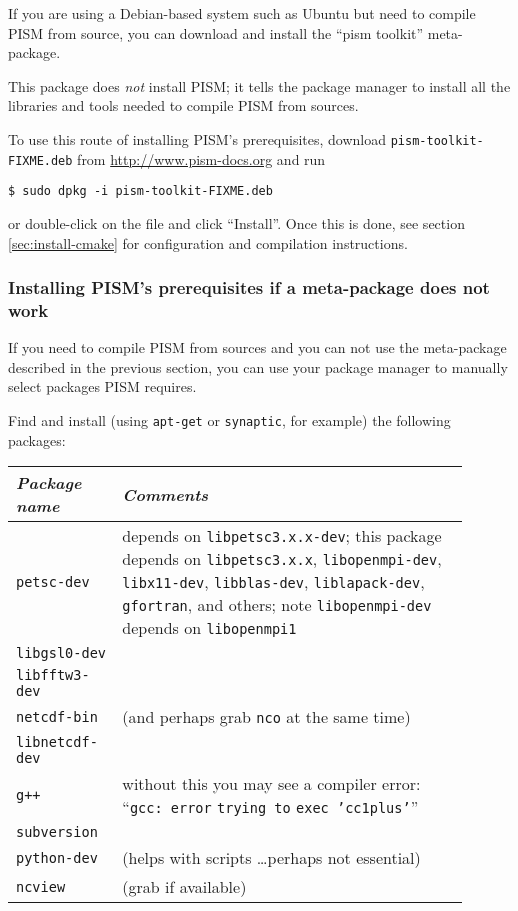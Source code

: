 \documentclass[11pt,final]{amsart}
\begin{document}
If you are using a Debian-based system such as Ubuntu but need to compile PISM from source, you can download and install the
``pism toolkit'' meta-package.

This package does \emph{not} install PISM; it tells the package manager to install all the libraries and tools needed to compile
PISM from sources.

To use this route of installing PISM's prerequisites, download \texttt{pism-toolkit-FIXME.deb} from \url{http://www.pism-docs.org} and run
\begin{verbatim}
$ sudo dpkg -i pism-toolkit-FIXME.deb
\end{verbatim}%
or double-click on the file and click ``Install''. Once this is done, see section \ref{sec:install-cmake} for configuration and
compilation instructions.

\subsubsection{Installing PISM's prerequisites if a meta-package does not work}
\label{sec:deb-libraries-by-hand}

If you need to compile PISM from sources and you can not use the meta-package described in the previous section, you can use your
package manager to manually select packages PISM requires.

Find and install (using \texttt{apt-get} or \texttt{synaptic}, for example) the following packages:
  \begin{center}
    \begin{tabular*}{0.9\linewidth}{p{0.2\linewidth}p{0.7\linewidth}}
      \toprule
      \emph{Package name} & \emph{Comments}\\
      \midrule
      \texttt{petsc-dev} & depends on \texttt{libpetsc3.x.x-dev}; this package 
      depends on \texttt{libpetsc3.x.x}, \texttt{libopenmpi-dev}, \texttt{libx11-dev},
      \texttt{libblas-dev}, \texttt{liblapack-dev}, \texttt{gfortran}, and others; 
      note \texttt{libopenmpi-dev} depends on \texttt{libopenmpi1}\\
      \texttt{libgsl0-dev} & \\
      \texttt{libfftw3-dev} & \\
      \texttt{netcdf-bin} & (and perhaps grab \texttt{nco} at the same time)\\
      \texttt{libnetcdf-dev} & \\
      \texttt{g++} & without this you may see a compiler error: ``\texttt{gcc: error} \texttt{trying to} \texttt{exec 'cc1plus'}''\\
      \texttt{subversion} & \\
      \texttt{python-dev} & (helps with scripts \dots perhaps not essential) \\
      \texttt{ncview} & (grab if available) \\
      \bottomrule
    \end{tabular*}
  \end{center}
\end{document}
